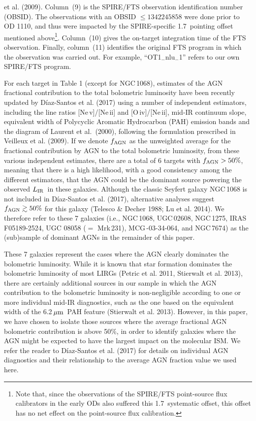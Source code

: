 \documentclass[preprint]{aastex}
\newcommand{\um}{\mbox{$\,\mu{\rm m}$}}
\newcommand{\LIR}{\mbox{$L_{\rm IR}$}}
\begin{document}
et al. (2009).  Column~(9) is the SPIRE/FTS observation identification number
(OBSID).  The observations with an OBSID $\leqslant 1342245858$ were done prior 
to OD 1110, and thus were impacted by the SPIRE-specific 1.7\arcsec\ pointing 
offset mentioned above\footnote{Note that, since the observations of 
the SPIRE/FTS point-source flux calibrators in the early ODs also suffered this 
1.7\arcsec\ systematic offset,  this offset has no net effect on the point-source 
flux calibration.}.   Column~(10) gives the on-target integration time of the FTS 
observation.  Finally, column~(11) identifies the original FTS program in which 
the observation was carried out.   For example, ``OT1$_-$nlu$_-$1'' refers to our 
own SPIRE/FTS program.


For each target in Table 1 (except for NGC\,1068), estimates of the AGN fractional 
contribution to 
the total bolometric luminosity have been recently updated by D\'iaz-Santos et 
al. (2017) using a number of independent estimators, including 
the line ratios [Ne\,{\sc v}]/[Ne\,{\sc ii}] and [O\,{\sc iv}]/[Ne\,{\sc ii}], 
mid-IR continuum slope, equivalent width of Polycyclic Aromatic Hydrocarbon
(PAH) emission bands and the diagram of Laurent et al.~(2000), following 
the formulation prescribed in Veilleux et al. (2009).
If we denote $f_{\rm AGN}$ as the unweighted average for the fractional 
contribution by AGN to the total bolometric luminosity, from these various independent 
estimates, there are a total of 6 targets with $f_{\rm AGN} > 50\%$, meaning 
that there is a high likelihood, with a good consistency among the different 
estimators, that the AGN could be the dominant source powering the observed \LIR\
in these galaxies.  Although the classic Seyfert galaxy NGC\,1068 is not included
in D\'iaz-Santos et al. (2017), alternative analyses suggest $f_{\rm AGN} \gtrsim 
50\%$ for this galaxy (Telesco \& Decher 1988; Lu et al. 2014). We therefore 
refer to these 7 galaxies (i.e., NGC\,1068, UGC\,02608, NGC\,1275, 
IRAS\,F05189-2524, UGC 08058 ($=$ Mrk\,231), MCG\,-03-34-064, and NGC\,7674) as 
the (sub)sample of dominant AGNs in the remainder of this paper. 



These 7 galaxies represent the cases where the AGN clearly dominates the bolometric 
luminosity.  
While it is known that star formation dominates the bolometric luminosity of most 
LIRGs (Petric et al. 2011, Stierwalt et al. 2013), there are certainly additional 
sources in our sample in which the AGN contribution to the bolometric luminosity is
non-negligible according to one or more individual mid-IR diagnostics, such as 
the one based on the equivalent width of the 6.2\um\ PAH feature 
(Stierwalt et al. 2013).  However, in this paper, we have 
chosen to isolate those sources where the average fractional AGN bolometric contribution
is above 50\%,  in order to identify galaxies where the AGN might be expected to 
have the largest impact on the molecular ISM.  We refer the reader to D\'iaz-Santos
et al. (2017) for details on individual AGN diagnostics and their relationship to 
the average AGN fraction value we used here.
\end{document}
